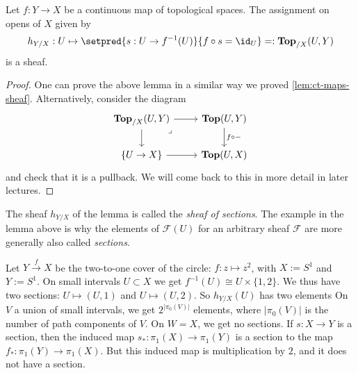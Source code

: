 \begin{lem}[name=sheaf of sections]\label{exmp:sheaf-of-sections}
    Let $f: Y \to X$ be a continuous map of topological spaces. The assignment on opens of $X$ given by 
    \[
        h_{Y/X}: U \mapsto \setpred{s: U \to f^{-1}(U) }{ f \circ s = \id_U} =: \cont[X](U, Y)
    \]
    is a sheaf.
\end{lem}
\begin{proof}
    One can prove the above lemma in a similar way we proved \cref{lem:ct-maps-sheaf}. 
    Alternatively, consider the diagram 
    \[\begin{tikzcd}
	{\cont[X](U,Y)} & {\cont(U,Y)} \\
	{\{U \to X\}} & {\cont(U,X)}
	\arrow["{f \circ -}", from=1-2, to=2-2]
	\arrow[from=1-1, to=2-1]
	\arrow[from=2-1, to=2-2]
	\arrow[from=1-1, to=1-2]
	\arrow["\lrcorner"{anchor=center, pos=0.125}, draw=none, from=1-1, to=2-2]
\end{tikzcd}\]
    and check that it is a pullback. We will come back to this in more detail in later lectures. 
\end{proof}

The sheaf \(h_{Y/X}\) of the lemma is called the \emph{sheaf of sections}.
The example in the lemma above is why the elements of $\mathcal{F}(U)$ for an arbitrary sheaf \(\mathcal F\) are more generally also called \emph{sections}. 

\begin{exmp}
    Let $Y \xrightarrow{f} X$ be the two-to-one cover of the circle: $f: z \mapsto z^2$, with $X := S^1$ and $Y:= S^1$. 
    On small intervals $U \subset X$ we get $f^{-1}(U)  \cong U \times \{1,2\}$. We thus have two sections: $U \mapsto (U, 1)$ and $U \mapsto (U, 2)$. So $h_{Y/X}(U)$ has two elements
    On $V$ a union of small intervals, we get $2^{|\pi_0(V)|}$ elements, where $|\pi_0(V)|$ is the number of path components of $V$. 
    On $W = X$, we get no sections. If $s: X \to Y$ is a section, then the induced map $s_*: \pi_1(X) \to \pi_1(Y)$ is a section to the map $f_*: \pi_1(Y) \to \pi_1(X)$. But this induced map is multiplication by $2$, and it does not have a section. 
\end{exmp}